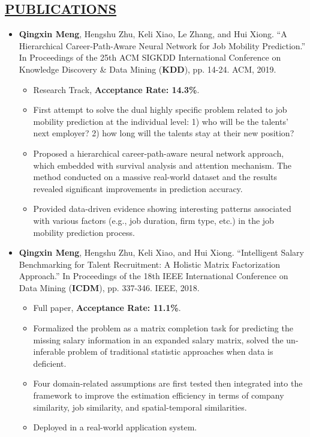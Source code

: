 \documentclass[11pt,letterpage]{res}
\begin{document}
\begin{resume}
\section{\underline{PUBLICATIONS}}
\begin{itemize}
\item
\textbf{Qingxin Meng}, Hengshu Zhu, Keli Xiao, Le Zhang, and Hui Xiong. ``A Hierarchical Career-Path-Aware Neural Network for Job Mobility Prediction.'' In Proceedings of the 25th ACM SIGKDD International Conference on Knowledge Discovery \& Data Mining (\textbf{KDD}), pp. 14-24. ACM, 2019.
\begin{itemize}
  \item Research Track, \textbf{Acceptance Rate: 14.3\%}.
  \item First attempt to solve the dual highly specific problem related to job mobility prediction at the individual level: 1) who will be the talents’ next employer? 2) how long will the talents stay at their new position? 
  \item Proposed a hierarchical career-path-aware neural network approach, which embedded with survival analysis and attention mechanism. The method conducted on a massive real-world dataset and the results revealed significant improvements in prediction accuracy.
  \item Provided data-driven evidence showing interesting patterns associated with various factors (e.g., job duration, firm type, etc.) in the job mobility prediction process.
\end{itemize}


\item
\textbf{Qingxin Meng}, Hengshu Zhu, Keli Xiao, and Hui Xiong. ``Intelligent Salary Benchmarking for Talent Recruitment: A Holistic Matrix Factorization Approach.'' In Proceedings of the 18th IEEE International Conference on Data Mining (\textbf{ICDM}), pp. 337-346. IEEE, 2018.
  \begin{itemize}
    \item Full paper, \textbf{Acceptance Rate: 11.1\%}.
    \item Formalized the problem as a matrix completion task for predicting the missing salary information in an expanded salary matrix, solved the un-inferable problem of traditional statistic approaches when data is deficient.
    \item Four domain-related assumptions are first tested then integrated into the framework to improve the estimation efficiency in terms of company similarity, job similarity, and spatial-temporal similarities.
    \item Deployed in a real-world application system.
  \end{itemize}
\end{itemize}


\end{resume}
\end{document}
